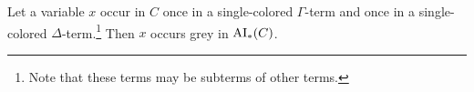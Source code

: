 \documentclass[,%
	paper=a4,%
	DIV11, %
	twoside=false,%
	liststotoc,
	bibtotoc,
	draft=false,%
	numbers=noendperiod
]{scrartcl}
\begin{document}
\begin{lemma}
	\label{lemma:smallest_colored_container}

	Let a variable $x$ occur in $C$ once in a single-colored $\Gamma$-term and once in a single-colored $\Delta$-term.\footnote{Note that these terms may be subterms of other terms.}
	Then $x$ occurs grey in $\operatorname{AI}_\mathrm{*}(C)$.


\end{lemma}
\end{document}
